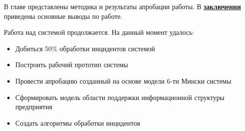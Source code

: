 В главе представлены методика и результаты апробации работы.
В \underline{\textbf{заключении}} приведены основные выводы по работе.


Работа над системой продолжается. На данный момент удалось:
\begin{itemize}
	\item Добиться 50\% обработки инцидентов системой
	\item Построить рабочий прототип системы
	\item Провести апробацию созданный на основе модели 6-ти Мински системы
	\item Сформировать модель области поддержки информационной структуры предприятия
	\item Создать алгоритмы обработки инцидентов
\end{itemize}
 

\renewcommand{\refname}{\large Публикации автора по теме диссертации}
\nocite{*}
\insertbiblioall

